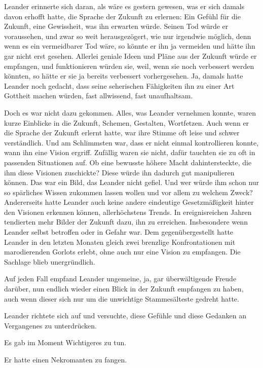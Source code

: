 \documentclass[10pt, a4paper, oneside]{book}
\begin{document}
Leander erinnerte sich daran, als wäre es gestern gewesen, was er sich damals davon erhofft hatte, die Sprache der Zukunft zu erlernen: Ein Gefühl für die Zukunft, eine Gewissheit, was ihn erwarten würde. Seinen Tod würde er voraussehen, und zwar so weit herausgezögert, wie nur irgendwie möglich, denn wenn es ein vermeidbarer Tod wäre, so könnte er ihn ja vermeiden und hätte ihn gar nicht erst gesehen. Allerlei geniale Ideen und Pläne aus der Zukunft würde er empfangen, und funktionieren würden sie, weil, wenn sie noch verbessert werden könnten, so hätte er sie ja bereits verbessert vorhergesehen. Ja, damals hatte Leander noch gedacht, dass seine seherischen Fähigkeiten ihn zu einer Art Gottheit machen würden, fast allwissend, fast unaufhaltsam.

Doch es war nicht dazu gekommen. Alles, was Leander vernehmen konnte, waren kurze Einblicke in die Zukunft, Schemen, Gestalten, Wortfetzen. Auch wenn er die Sprache der Zukunft erlernt hatte, war ihre Stimme oft leise und schwer verständlich. Und am Schlimmsten war, dass er nicht einmal kontrollieren konnte, wann ihn eine Vision ergriff. Zufällig waren sie nicht, dafür tauchten sie zu oft in passenden Situationen auf. Ob eine bewusste höhere Macht dahintersteckte, die ihm diese Visionen zuschickte? Diese würde ihn dadurch gut manipulieren können. Das war ein Bild, das Leander nicht gefiel. Und wer würde ihm schon nur so spärliches Wissen zukommen lassen wollen und vor allem zu welchem Zweck? Andererseits hatte Leander auch keine andere eindeutige Gesetzmäßigkeit hinter den Visionen erkennen können, allerhöchstens Trends. In ereignisreichen Jahren tendierten mehr Bilder der Zukunft dazu, ihn zu erreichen. Insbesondere wenn Leander selbst betroffen oder in Gefahr war. Dem gegenübergestellt hatte Leander in den letzten Monaten gleich zwei brenzlige Konfrontationen mit marodierenden Gorlots erlebt, ohne auch nur eine Vision zu empfangen. Die Sachlage blieb unergründlich.

Auf jeden Fall empfand Leander ungemeine, ja, gar überwältigende Freude darüber, nun endlich wieder einen Blick in der Zukunft empfangen zu haben, auch wenn dieser sich nur um die unwichtige Stammesälteste gedreht hatte.

Leander richtete sich auf und versuchte, diese Gefühle und diese Gedanken an Vergangenes zu unterdrücken.

Es gab im Moment Wichtigeres zu tun.

Er hatte einen Nekromanten zu fangen.
\end{document}
